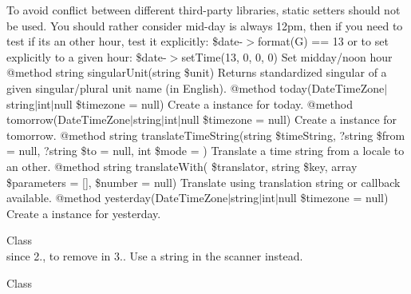 \begin{DoxyRefList}
To avoid conflict between different third-\/party libraries, static setters should not be used. You should rather consider mid-\/day is always 12pm, then if you need to test if it\textquotesingle{}s an other hour, test it explicitly\+: \$date-\/\texorpdfstring{$>$}{>}format(\textquotesingle{}G\textquotesingle{}) == 13 or to set explicitly to a given hour\+: \$date-\/\texorpdfstring{$>$}{>}set\+Time(13, 0, 0, 0) Set midday/noon hour @method string singular\+Unit(string \$unit) Returns standardized singular of a given singular/plural unit name (in English). @method  today(Date\+Time\+Zone\texorpdfstring{$\vert$}{|}string\texorpdfstring{$\vert$}{|}int\texorpdfstring{$\vert$}{|}null \$timezone = null) Create a  instance for today. @method  tomorrow(Date\+Time\+Zone\texorpdfstring{$\vert$}{|}string\texorpdfstring{$\vert$}{|}int\texorpdfstring{$\vert$}{|}null \$timezone = null) Create a  instance for tomorrow. @method string translate\+Time\+String(string \$time\+String, ?string \$from = null, ?string \$to = null, int \$mode = ) Translate a time string from a locale to an other. @method string translate\+With( \$translator, string \$key, array \$parameters = \mbox{[}\mbox{]}, \$number = null) Translate using translation string or callback available. @method  yesterday(Date\+Time\+Zone\texorpdfstring{$\vert$}{|}string\texorpdfstring{$\vert$}{|}int\texorpdfstring{$\vert$}{|}null \$timezone = null) Create a  instance for yesterday. 
\item[Class \doxylink{class_masterminds_1_1_h_t_m_l5_1_1_parser_1_1_file_input_stream}{File\+Input\+Stream} ]\hfill \\
\label{deprecated__deprecated000158}%
%
since 2., to remove in 3.. Use a string in the scanner instead.  
\item[Class \doxylink{class_monolog_1_1_formatter_1_1_flowdock_formatter}{Flowdock\+Formatter} ]\hfill \\
\label{deprecated__deprecated000175}%
%

\end{DoxyRefList}
